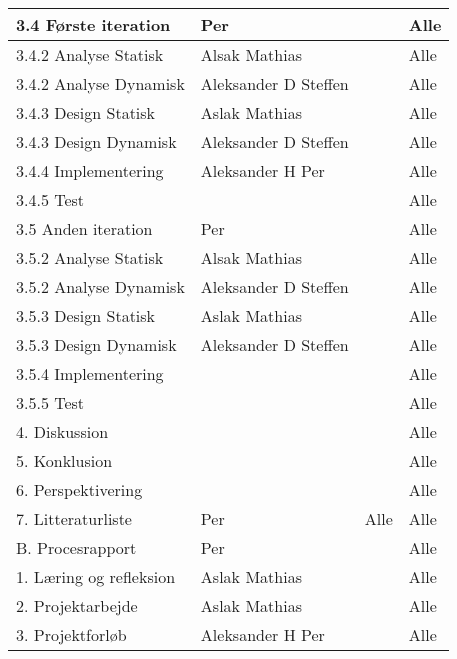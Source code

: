\begin{center}
\begin{longtable}{|m{5.8cm}|m{3.5cm}|m{3.5cm}|m{3.2cm}|}
3.4 Første iteration & Per & & Alle\\ \hline
3.4.2 Analyse Statisk & Alsak \newline Mathias & & Alle\\ \hline
3.4.2 Analyse Dynamisk & Aleksander D \newline Steffen & & Alle\\ \hline
3.4.3 Design Statisk & Aslak \newline Mathias  & & Alle\\ \hline
3.4.3 Design Dynamisk & Aleksander D \newline Steffen &  & Alle\\ \hline
3.4.4 Implementering & Aleksander H \newline Per & & Alle\\ \hline
3.4.5 Test & & & Alle\\ \hline

3.5 Anden iteration & Per & & Alle\\ \hline
3.5.2 Analyse Statisk & Alsak \newline Mathias & & Alle\\ \hline
3.5.2 Analyse Dynamisk & Aleksander D \newline Steffen & & Alle\\ \hline
3.5.3 Design Statisk & Aslak \newline Mathias  & & Alle\\ \hline
3.5.3 Design Dynamisk & Aleksander D \newline Steffen &  & Alle\\ \hline
3.5.4 Implementering & & & Alle\\ \hline
3.5.5 Test & & & Alle\\ \hline

4. Diskussion & & & Alle\\ \hline

5. Konklusion & & & Alle\\ \hline

6. Perspektivering & & & Alle\\ \hline

7. Litteraturliste & Per & Alle & Alle\\ \hline

B. Procesrapport & Per & & Alle\\ \hline
1. Læring og refleksion & Aslak \newline Mathias & & Alle\\ \hline
2. Projektarbejde &  Aslak \newline Mathias & & Alle\\ \hline
3. Projektforløb & Aleksander H \newline Per & & Alle\\ \hline


\end{longtable}
\end{center}
